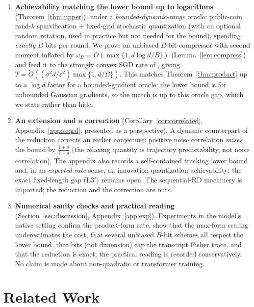\documentclass[11pt]{article}
\theoremstyle{definition}
\newcommand{\eps}{\varepsilon}
\newcommand{\proven}{}
\newcommand{\partialtag}{}
\begin{document}
\begin{enumerate}[leftmargin=1.6em,itemsep=2pt]
  contraction shown to be $O(\mathrm{SNR})$) together with why converting it to the needed KL contraction
  is harder than the Fisher route used in the main text. \proven (centroid) $/$ \partialtag (MI route)
  \item \textbf{Achievability matching the lower bound up to logarithms} (Theorem~\ref{thm:upper}),
  under a \emph{bounded-dynamic-range} oracle: public-coin rand-$k$ sparsification $+$ fixed-grid
  stochastic quantization (with an optional random rotation, used in practice but not needed for the
  bound), spending \emph{exactly} $B$ bits per round. We prove an unbiased $B$-bit compressor with second
  moment inflated by $\omega_B=O(\max\{1,d\log d/B\})$ (Lemma~\ref{lem:compress}) and feed it to the
  strongly convex SGD rate of \citet{bottou2018optimization}, giving
  $T=\widetilde O((\sigma^2 d/\eps^2)\max\{1,d/B\})$. This matches Theorem~\ref{thm:product} up to a
  $\log d$ factor for a bounded-gradient oracle; the lower bound is for unbounded Gaussian gradients, so
  the match is up to this oracle gap, which we state rather than hide.
  \item \textbf{An extension and a correction} (Corollary~\ref{cor:correlated},
  Appendix~\ref{app:seqrd}, presented as a perspective). A dynamic counterpart of the reduction
  corrects an earlier conjecture: positive noise correlation \emph{raises} the bound by
  $\tfrac{1+\rho}{1-\rho}$ (the relaxing quantity is trajectory predictability, not noise correlation).
  The appendix also records a self-contained tracking lower bound and, in an \emph{expected-rate} sense,
  an innovation-quantization achievability; the exact fixed-length gap (L3$'$) remains open. The
  sequential-RD machinery is imported; the reduction and the correction are ours.
  \item \textbf{Numerical sanity checks and practical reading} (Section~\ref{sec:discussion}, Appendix~\ref{app:exp}).
  Experiments in the model's native setting confirm the product-form rate, show that the max-form
  scaling underestimates the cost, that several unbiased $B$-bit schemes all respect the lower bound,
  that bits (not dimension) cap the transcript Fisher trace, and that the reduction is exact; the
  practical reading is recorded conservatively. No claim is made about non-quadratic or transformer
  training.
\end{enumerate}

\section{Related Work}
\label{sec:related}
\end{document}
